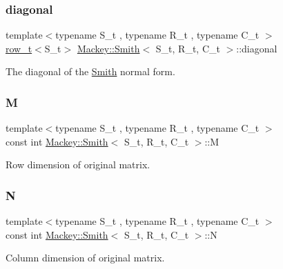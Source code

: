 \subsubsection{\texorpdfstring{diagonal}{diagonal}}
{\footnotesize\ttfamily template$<$typename S\+\_\+t , typename R\+\_\+t , typename C\+\_\+t $>$ \\
\hyperlink{namespaceMackey_a6d37801553e585770ca7d1243ab3b213}{row\+\_\+t}$<$S\+\_\+t$>$ \hyperlink{classMackey_1_1Smith}{Mackey\+::\+Smith}$<$ S\+\_\+t, R\+\_\+t, C\+\_\+t $>$\+::diagonal}



The diagonal of the \hyperlink{classMackey_1_1Smith}{Smith} normal form. 

\mbox{\label{classMackey_1_1Smith_aa651a3c122566df7847bec70583a5f48}} 
\subsubsection{\texorpdfstring{M}{M}}
{\footnotesize\ttfamily template$<$typename S\+\_\+t , typename R\+\_\+t , typename C\+\_\+t $>$ \\
const int \hyperlink{classMackey_1_1Smith}{Mackey\+::\+Smith}$<$ S\+\_\+t, R\+\_\+t, C\+\_\+t $>$\+::M\hspace{0.3cm}{\ttfamily [protected]}}



Row dimension of original matrix. 

\mbox{\label{classMackey_1_1Smith_a642b4538712abcdcee8beb3f0ff08b89}} 
\subsubsection{\texorpdfstring{N}{N}}
{\footnotesize\ttfamily template$<$typename S\+\_\+t , typename R\+\_\+t , typename C\+\_\+t $>$ \\
const int \hyperlink{classMackey_1_1Smith}{Mackey\+::\+Smith}$<$ S\+\_\+t, R\+\_\+t, C\+\_\+t $>$\+::N\hspace{0.3cm}{\ttfamily [protected]}}



Column dimension of original matrix. 

\mbox{\label{classMackey_1_1Smith_a711a1726ec0da22e9233aa269d66bf73}} 

